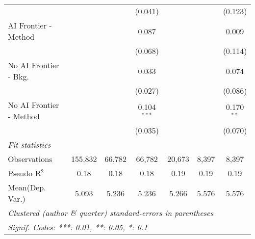 \begin{tabular}{lcccccc}
                           &               &               & (0.041)       &               &               & (0.123)\\   
   AI Frontier - Method    &               &               & 0.087         &               &               & 0.009\\   
                           &               &               & (0.068)       &               &               & (0.114)\\   
   No AI Frontier - Bkg.   &               &               & 0.033         &               &               & 0.074\\   
                           &               &               & (0.027)       &               &               & (0.086)\\   
   No AI Frontier - Method &               &               & 0.104$^{***}$ &               &               & 0.170$^{**}$\\   
                           &               &               & (0.035)       &               &               & (0.070)\\   
   \midrule
   \emph{Fit statistics}\\
   Observations            & 155,832       & 66,782        & 66,782        & 20,673        & 8,397         & 8,397\\  
   Pseudo R$^2$            & 0.18          & 0.18          & 0.18          & 0.19          & 0.19          & 0.19\\  
Mean(Dep. Var.) & 5.093 & 5.236 & 5.236 & 5.266 & 5.576 & 5.576 \\
   \midrule \midrule
   \multicolumn{7}{l}{\emph{Clustered (author \& quarter) standard-errors in parentheses}}\\
   \multicolumn{7}{l}{\emph{Signif. Codes: ***: 0.01, **: 0.05, *: 0.1}}\\
\end{tabular}
\par\endgroup
